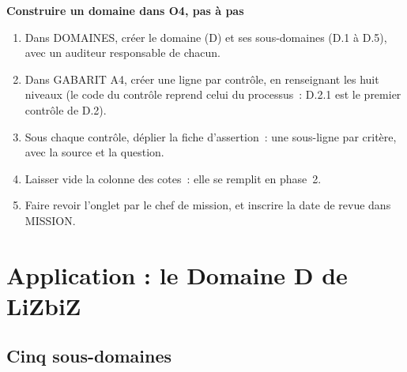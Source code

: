\begin{boxprocedure}
\textbf{Construire un domaine dans O4, pas à pas}
\begin{enumerate}
    \item Dans DOMAINES, créer le domaine (D) et ses sous-domaines (D.1 à
          D.5), avec un auditeur responsable de chacun.
    \item Dans GABARIT A4, créer une ligne par contrôle, en renseignant les
          huit niveaux (le code du contrôle reprend celui du processus~:
          D.2.1 est le premier contrôle de D.2).
    \item Sous chaque contrôle, déplier la fiche d'assertion~: une
          sous-ligne par critère, avec la source et la question.
    \item Laisser vide la colonne des cotes~: elle se remplit en phase~2.
    \item Faire revoir l'onglet par le chef de mission, et inscrire la date
          de revue dans MISSION.
\end{enumerate}
\end{boxprocedure}

\section{Application : le Domaine D de LiZbiZ}
\label{sec:c09-lizbiz}

\subsection{Cinq sous-domaines}

